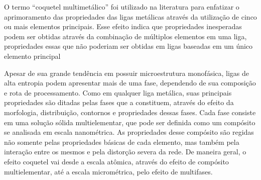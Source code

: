 O termo ``coquetel multimetálico'' foi utilizado na literatura para enfatizar o aprimoramento das propriedades das ligas metálicas através da utilização de cinco ou mais elementos principais. Esse efeito indica que propriedades inesperadas podem ser
obtidas através da combinação de múltiplos elementos em uma liga, propriedades essas
que não poderiam ser obtidas em ligas baseadas em um único elemento principal

Apesar de sua grande tendência em possuir microestrutura monofásica, ligas de alta
entropia podem apresentar mais de uma fase, dependendo de sua composição e rota de 
processamento. Como em qualquer liga metálica, suas principais propriedades são
ditadas pelas fases que a constituem, através do efeito da morfologia, distribuição,
contornos e propriedades dessas fases. Cada fase consiste em uma solução sólida
multielementar, que pode ser definida como um compósito se analisada em escala
nanométrica. As propriedades desse compósito são regidas não somente pelas
propriedades básicas de cada elemento, mas também pela interação entre os mesmos e
pela distorção severa da rede. De maneira geral, o efeito coquetel vai desde a escala
atômica, através do efeito de compósito multielementar, até a escala micrométrica, pelo
efeito de multifases.

